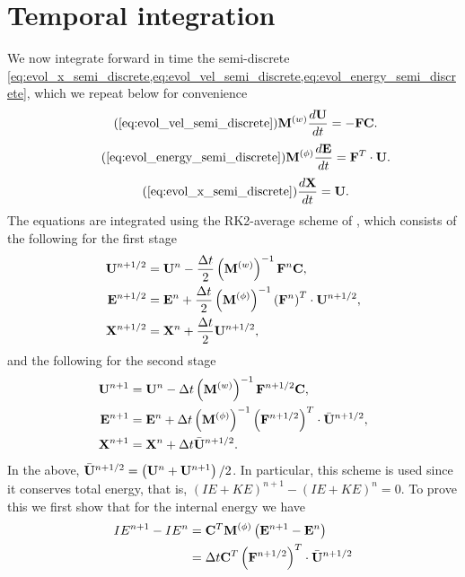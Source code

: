 \documentclass[11pt]{report}
\begin{document}
\section{Temporal integration}
We now integrate forward in time the semi-discrete \cref{eq:evol_x_semi_discrete,eq:evol_vel_semi_discrete,eq:evol_energy_semi_discrete}, which we repeat below for convenience
\begin{equation}
    \tag{\ref{eq:evol_vel_semi_discrete}}
    \Mvec^{(w)} \frac{d\Uvec}{dt} = -\Fvec \Cvec.
\end{equation}
\begin{equation}
    \tag{\ref{eq:evol_energy_semi_discrete}}
    \Mvec^{(\phi)} \frac{d\Evec}{dt} = \Fvec^T \cdot \Uvec.
\end{equation}
\begin{equation}
    \tag{\ref{eq:evol_x_semi_discrete}}
    \frac{d\Xvec}{dt} = \Uvec.
\end{equation}
The equations are integrated using the RK2-average scheme of \cite{dobrev2012}, which consists of the following for the first stage
\begin{align}
    \mathbf{U}^{n+1/2} &= \mathbf{U}^n - \frac{\Delta t}{2} \left( \mathbf{M}^{(w)} \right)^{-1} \mathbf{F}^n \mathbf{C}, \nonumber \\
    \mathbf{E}^{n+1/2} &= \mathbf{E}^n + \frac{\Delta t}{2} \left( \mathbf{M}^{(\phi)} \right)^{-1} \left( \mathbf{F}^n \right)^T \cdot \mathbf{U}^{n+1/2}, \nonumber \\
    \mathbf{X}^{n+1/2} &= \mathbf{X}^n + \frac{\Delta t}{2} \mathbf{U}^{n+1/2},
\end{align}
and the following for the second stage
\begin{align}
    \mathbf{U}^{n+1} &= \mathbf{U}^n - \Delta t \left( \mathbf{M}^{(w)} \right)^{-1} \mathbf{F}^{n+1/2} \mathbf{C}, \nonumber \\
    \mathbf{E}^{n+1} &= \mathbf{E}^n + \Delta t \left( \mathbf{M}^{(\phi)} \right)^{-1} \left( \mathbf{F}^{n+1/2} \right)^T \cdot \bar{\mathbf{U}}^{n+1/2}, \nonumber \\
    \mathbf{X}^{n+1} &= \mathbf{X}^n + \Delta t \bar{\mathbf{U}}^{n+1/2}.
\end{align}
In the above, $\bar{\mathbf{U}}^{n+1/2} = \left( \mathbf{U}^n + \mathbf{U}^{n+1} \right)/2$. In particular, this scheme is used since it conserves total energy, that is, $(IE + KE)^{n+1} - (IE + KE)^n = 0$. To prove this we first show that for the internal energy we have
\begin{align}
    \label{eq:temp_ie_change}
    IE^{n+1} - IE^n &= \mathbf{C}^T \mathbf{M}^{(\phi)} \left( \mathbf{E}^{n+1} - \mathbf{E}^n \right) \nonumber \\
    &= \Delta t \mathbf{C}^T \left( \mathbf{F}^{n+1/2} \right)^T \cdot \bar{\mathbf{U}}^{n+1/2}
\end{align}
\end{document}
